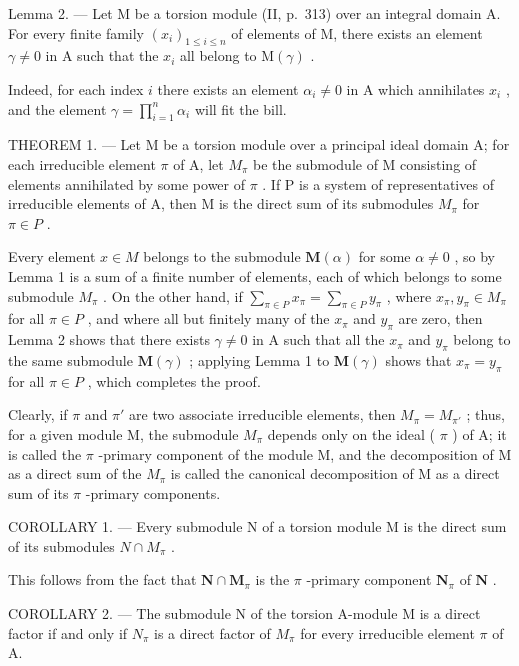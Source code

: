 Lemma 2. --- Let M be a torsion module (II, p.~313) over an integral domain A. For every finite family \((x_{i})_{1 \leq i \leq n}\) of elements of M, there exists an element \(\gamma \neq 0\) in A such that the \(x_{i}\) all belong to \(\mathrm{M}(\gamma)\) .

Indeed, for each index \(i\) there exists an element \(\alpha_{i} \neq 0\) in A which annihilates \(x_{i}\) , and the element \(\gamma = \prod_{i=1}^{n} \alpha_{i}\) will fit the bill.

THEOREM 1. --- Let M be a torsion module over a principal ideal domain A; for each irreducible element \(\pi\) of A, let \(M_{\pi}\) be the submodule of M consisting of elements annihilated by some power of \(\pi\) . If P is a system of representatives of irreducible elements of A, then M is the direct sum of its submodules \(M_{\pi}\) for \(\pi \in P\) .

Every element \(x \in M\) belongs to the submodule \(\mathbf{M}(\alpha)\) for some \(\alpha \neq 0\) , so by Lemma 1 is a sum of a finite number of elements, each of which belongs to some submodule \(M_{\pi}\) . On the other hand, if \(\sum_{\pi \in P} x_{\pi} = \sum_{\pi \in P} y_{\pi}\) , where \(x_{\pi}, y_{\pi} \in M_{\pi}\) for all \(\pi \in P\) , and where all but finitely many of the \(x_{\pi}\) and \(y_{\pi}\) are zero, then Lemma 2 shows that there exists \(\gamma \neq 0\) in A such that all the \(x_{\pi}\) and \(y_{\pi}\) belong to the same submodule \(\mathbf{M}(\gamma)\) ; applying Lemma 1 to \(\mathbf{M}(\gamma)\) shows that \(x_{\pi} = y_{\pi}\) for all \(\pi \in P\) , which completes the proof.

Clearly, if \(\pi\) and \(\pi'\) are two associate irreducible elements, then \(M_{\pi} = M_{\pi'}\) ; thus, for a given module M, the submodule \(M_{\pi}\) depends only on the ideal ( \(\pi\) ) of A; it is called the \(\pi\) -primary component of the module M, and the decomposition of M as a direct sum of the \(M_{\pi}\) is called the canonical decomposition of M as a direct sum of its \(\pi\) -primary components.

COROLLARY 1. --- Every submodule N of a torsion module M is the direct sum of its submodules \(N \cap M_{\pi}\) .

This follows from the fact that \(\mathbf{N} \cap \mathbf{M}_{\pi}\) is the \(\pi\) -primary component \(\mathbf{N}_{\pi}\) of \(\mathbf{N}\) .

COROLLARY 2. --- The submodule N of the torsion A-module M is a direct factor if and only if \(N_{\pi}\) is a direct factor of \(M_{\pi}\) for every irreducible element \(\pi\) of A.


